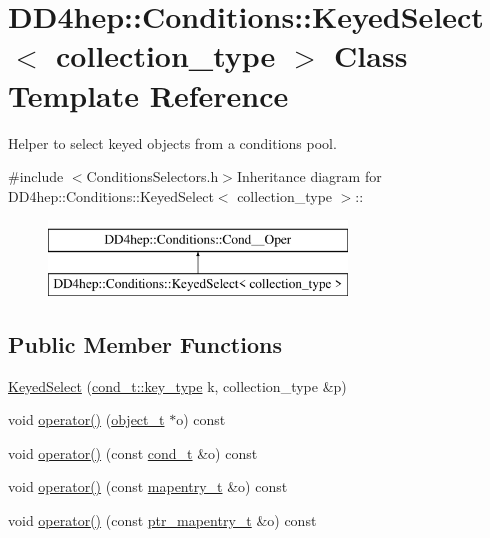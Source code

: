 \hypertarget{class_d_d4hep_1_1_conditions_1_1_keyed_select}{
\section{DD4hep::Conditions::KeyedSelect$<$ collection\_\-type $>$ Class Template Reference}
\label{class_d_d4hep_1_1_conditions_1_1_keyed_select}
}


Helper to select keyed objects from a conditions pool.  


{\ttfamily \#include $<$ConditionsSelectors.h$>$}Inheritance diagram for DD4hep::Conditions::KeyedSelect$<$ collection\_\-type $>$::\begin{figure}[H]
\begin{center}
\leavevmode
\includegraphics[height=2cm]{class_d_d4hep_1_1_conditions_1_1_keyed_select}
\end{center}
\end{figure}
\subsection*{Public Member Functions}
\begin{DoxyCompactItemize}
\item 
\hyperlink{class_d_d4hep_1_1_conditions_1_1_keyed_select_a4158acaaf6c6911619a41d39fe92d247}{KeyedSelect} (\hyperlink{class_d_d4hep_1_1_conditions_1_1_condition_a7528efa762e8cc072ef80ea67c3531f9}{cond\_\-t::key\_\-type} k, collection\_\-type \&p)
\item 
void \hyperlink{class_d_d4hep_1_1_conditions_1_1_keyed_select_a9a83019127f78290ed5069790aeb855e}{operator()} (\hyperlink{class_d_d4hep_1_1_conditions_1_1_interna_1_1_condition_object}{object\_\-t} $\ast$o) const 
\item 
void \hyperlink{class_d_d4hep_1_1_conditions_1_1_keyed_select_a13047ce6f0f51f5f7487180c1dff2dcc}{operator()} (const \hyperlink{class_d_d4hep_1_1_conditions_1_1_condition}{cond\_\-t} \&o) const 
\item 
void \hyperlink{class_d_d4hep_1_1_conditions_1_1_keyed_select_a31e838b214cd6eaa8f702f78bff0c075}{operator()} (const \hyperlink{class_d_d4hep_1_1_conditions_1_1_cond_____oper_a877dac3da66795207aed15be219acbdc}{mapentry\_\-t} \&o) const 
\item 
void \hyperlink{class_d_d4hep_1_1_conditions_1_1_keyed_select_a4a376af196341fff56f4e44331bf79fe}{operator()} (const \hyperlink{class_d_d4hep_1_1_conditions_1_1_cond_____oper_a0949e4bd5f90cd3fae2394cf30983973}{ptr\_\-mapentry\_\-t} \&o) const 
\end{DoxyCompactItemize}
